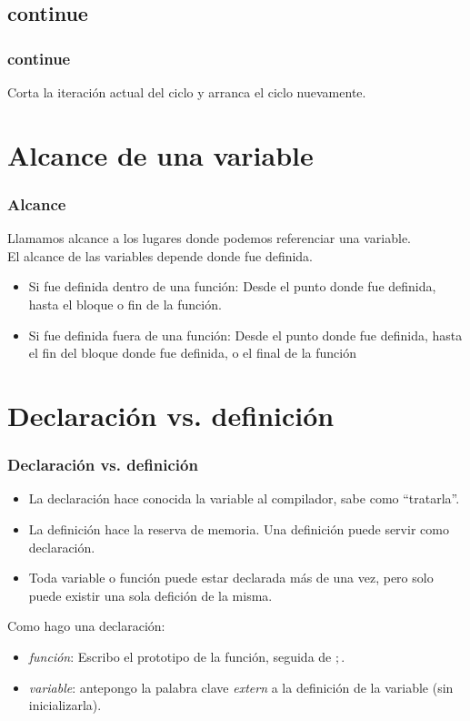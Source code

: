 \documentclass{beamer}
\begin{document}
\subsection{continue}
\begin{frame}
\frametitle{continue}
Corta la iteración actual del ciclo y arranca el ciclo nuevamente.
\end{frame}


\section{Alcance de una variable}

\begin{frame}
\frametitle{Alcance}
Llamamos alcance a los lugares donde podemos referenciar una variable. \\
El alcance de las variables depende donde fue definida. 
\begin{itemize}
 \item Si fue definida dentro de una función: Desde el punto donde fue definida, hasta el bloque o fin de la función.
 \item Si fue definida fuera de una función: Desde el punto donde fue definida, hasta el fin del bloque donde fue definida, o el final de la función
\end{itemize}

\end{frame}


\section{Declaración vs. definición}
\begin{frame}
\frametitle{Declaración vs. definición}

\begin{itemize}
 \item La declaración hace conocida la variable al compilador, sabe como ``tratarla''.
 \item La definición hace la reserva de memoria. Una definición puede servir como declaración.
 \item Toda variable o función puede estar declarada más de una vez, pero solo puede existir una sola defición de la misma.
\end{itemize}
Como hago una declaración:
\begin{itemize}
 \item \emph{función}: Escribo el prototipo de la función, seguida de $;$.
 \item \emph{variable}: antepongo la palabra clave \emph{extern} a la definición de la variable (sin inicializarla).
\end{itemize}

\end{frame}
\end{document}
